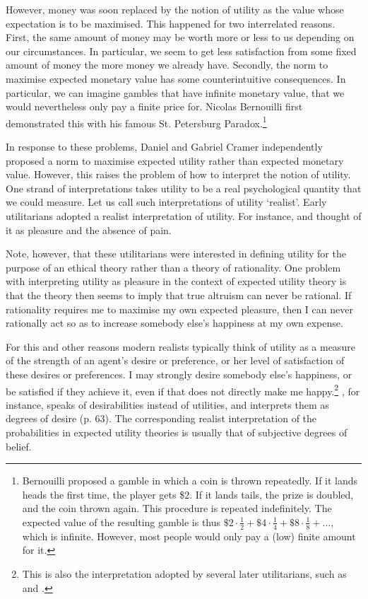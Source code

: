 However, money was soon replaced by the notion of utility as the value whose expectation is to be maximised. This happened for two interrelated reasons. First, the same amount of money may be worth more or less to us depending on our circumstances. In particular, we seem to get less satisfaction from some fixed amount of money the more money we already have. Secondly, the norm to maximise expected monetary value has some counterintuitive consequences. In particular, we can imagine gambles that have infinite monetary value, that we would nevertheless only pay a finite price for. Nicolas Bernouilli first demonstrated this with his famous St. Petersburg Paradox.\footnote{Bernouilli proposed a gamble in which a coin is thrown repeatedly. If it lands heads the first time, the player gets \$2. If it lands tails, the prize is doubled, and the coin thrown again. This procedure is repeated indefinitely. The expected value of the resulting gamble is thus $\$2 \cdot \frac{1}{2} + \$4 \cdot \frac{1}{4} + \$8 \cdot \frac{1}{8} +...$, which is infinite. However, most people would only pay a (low) finite amount for it.}

In response to these problems, Daniel \citet{Bernouilli1738} and Gabriel Cramer independently proposed a norm to maximise expected utility rather than expected monetary value. However, this raises the problem of how to interpret the notion of utility. One strand of interpretations takes utility to be a real psychological quantity that we could measure. Let us call such interpretations of utility `realist'. Early utilitarians adopted a realist interpretation of utility. For instance, \citet{Bentham1789} and \citet{Mill1861} thought of it as pleasure and the absence of pain.

Note, however, that these utilitarians were interested in defining utility for the purpose of an ethical theory rather than a theory of rationality. One problem with interpreting utility as pleasure in the context of expected utility theory is that the theory then seems to imply that true altruism can never be rational. If rationality requires me to maximise my own expected pleasure, then I can never rationally act so as to increase somebody else's happiness at my own expense.

For this and other reasons modern realists typically think of utility as a measure of the strength of an agent's desire or preference, or her level of satisfaction of these desires or preferences. I may strongly desire somebody else's happiness, or be satisfied if they achieve it, even if that does not directly make me happy.\footnote{This is also the interpretation adopted by several later utilitarians, such as \citet{Hare1981} and \citet{Singer1993}.} \citet{Jeffrey1983}, for instance, speaks of desirabilities instead of utilities, and interprets them as degrees of desire (p. 63). The corresponding realist interpretation of the probabilities in expected utility theories is usually that of subjective degrees of belief.

